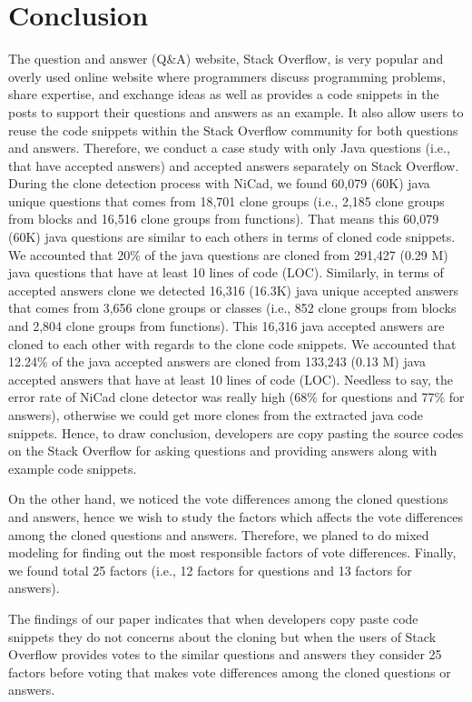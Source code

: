 \documentclass[conference]{IEEEtran}
\begin{document}
\section{Conclusion}
The question and answer (Q\&A) website, Stack Overflow, is very popular and overly used online website where programmers discuss programming problems, share expertise, and exchange ideas as well as provides  a code snippets in the posts to support their questions and answers as an example. It also allow users to reuse the code snippets within the Stack Overflow community for both questions and answers. Therefore, we conduct a case study with only Java questions (i.e., that have accepted answers) and accepted answers separately on Stack Overflow. During the clone detection process with NiCad, we found 60,079 (60K) java unique questions that comes from 18,701 clone groups (i.e., 2,185 clone groups from blocks and 16,516 clone groups from functions). That means this 60,079 (60K) java questions are similar to each others in terms of cloned code snippets. We accounted that 20\% of the java questions  are cloned from 291,427 (0.29 M) java questions that have at least 10 lines of code (LOC). Similarly, in terms of accepted answers clone we detected 16,316 (16.3K) java unique accepted answers that comes from 3,656 clone groups or classes (i.e., 852 clone groups from blocks and 2,804 clone groups from functions). This 16,316 java accepted answers are cloned to each other with regards to the clone code snippets. We accounted that 12.24\% of the java accepted answers  are cloned from 133,243 (0.13 M)  java accepted answers that have at least 10 lines of code (LOC). Needless to say, the error rate of NiCad clone detector was really high (68\% for questions and 77\% for answers), otherwise we could get more clones from the extracted java code snippets. Hence, to draw conclusion, developers are copy pasting the source codes on the Stack Overflow for asking questions and providing answers along with example code snippets.   

On the other hand, we noticed the vote differences among the cloned questions and answers, hence we wish to study the factors which affects the vote differences among the cloned questions and answers. Therefore, we planed to do mixed modeling for finding out the most responsible factors of vote differences. Finally, we found total 25 factors (i.e., 12 factors for questions and 13 factors for answers). 

The findings of our paper indicates that when developers copy paste code snippets they do not concerns about the cloning but when the users of Stack Overflow provides votes to the similar questions and answers they consider 25 factors before voting that makes vote differences among the cloned questions or answers.
\end{document}
